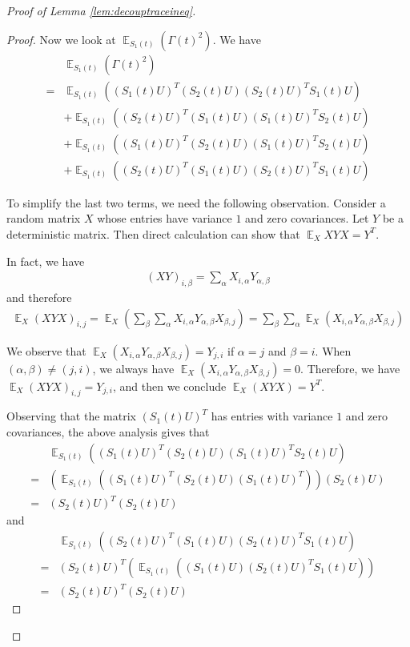 \documentclass[11pt]{amsart}
\numberwithin{equation}{section}
\numberwithin{equation}{section}
\DeclareMathOperator{\E}{\mathbb{E}}
\theoremstyle{remark}
\theoremstyle{definition}
\begin{document}
\begin{proof}[Proof of Lemma \ref{lem:decouptraceineq}]
\begin{proof}
Now we look at $\E_{S_1(t)}(\Gamma(t)^2)$. We have
\begin{align*}
    &\E_{S_1(t)}(\Gamma(t)^2)\\=&\E_{S_1(t)}((S_1(t)U)^T(S_2(t)U)(S_2(t)U )^TS_1(t)U)\\&+\E_{S_1(t)}((S_2(t)U)^T(S_1(t)U)(S_1(t)U )^TS_2(t)U)\\&+\E_{S_1(t)}((S_1(t)U)^T(S_2(t)U)(S_1(t)U )^TS_2(t)U)\\&+\E_{S_1(t)}((S_2(t)U)^T(S_1(t)U)(S_2(t)U )^TS_1(t)U)
\end{align*}

To simplify the last two terms, we need the following observation. Consider a random matrix $X$ whose entries have variance $1$ and zero covariances. Let $Y$ be a deterministic matrix. Then direct calculation can show that $\E_X XYX=Y^T$.

In fact, we have
\begin{align*}
(XY)_{i,\beta}=\sum_{\alpha}X_{i,\alpha}Y_{\alpha,\beta}
\end{align*}
and therefore
\begin{align*}
\E_X (XYX)_{i,j}=\E_X (\sum_{\beta}\sum_{\alpha}X_{i,\alpha}Y_{\alpha,\beta}X_{\beta,j})=\sum_{\beta}\sum_{\alpha}\E_X(X_{i,\alpha}Y_{\alpha,\beta}X_{\beta,j})
\end{align*}

We observe that $\E_X(X_{i,\alpha}Y_{\alpha,\beta}X_{\beta,j})=Y_{j,i}$ if $\alpha=j$ and $\beta=i$. When $(\alpha,\beta) \ne (j,i)$, we always have $\E_X(X_{i,\alpha}Y_{\alpha,\beta}X_{\beta,j})=0$. Therefore, we have $\E_X (XYX)_{i,j}=Y_{j,i}$, and then we conclude $\E_X (XYX)=Y^T$. 

Observing that the matrix $(S_1(t)U)^T$ has entries with variance $1$ and zero covariances, the above analysis gives that
\begin{align*}
    &\E_{S_1(t)}((S_1(t)U)^T(S_2(t)U)(S_1(t)U )^TS_2(t)U)\\=&(\E_{S_1(t)}((S_1(t)U)^T(S_2(t)U)(S_1(t)U )^T))(S_2(t)U)\\=&(S_2(t)U)^T(S_2(t)U)
\end{align*}
and
\begin{align*}
    &\E_{S_1(t)}((S_2(t)U)^T(S_1(t)U)(S_2(t)U )^TS_1(t)U)\\=&(S_2(t)U)^T(\E_{S_1(t)}((S_1(t)U)(S_2(t)U )^TS_1(t)U))\\=&(S_2(t)U)^T(S_2(t)U)
\end{align*}


\end{proof}
\end{proof}
\end{document}
